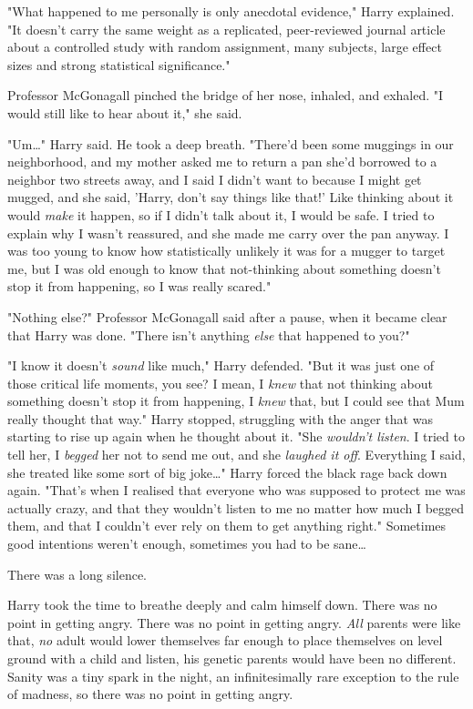 "What happened to me personally is only anecdotal evidence," Harry explained. 
"It doesn't carry the same weight as a replicated, peer-reviewed journal 
article about a controlled study with random assignment, many subjects, large 
effect sizes and strong statistical significance."

Professor McGonagall pinched the bridge of her nose, inhaled, and exhaled. "I 
would still like to hear about it," she said.

"Um{\ldots}" Harry said. He took a deep breath. "There'd been some muggings in 
our neighborhood, and my mother asked me to return a pan she'd borrowed to a 
neighbor two streets away, and I said I didn't want to because I might get 
mugged, and she said, 'Harry, don't say things like that!' Like thinking about 
it would \emph{make} it happen, so if I didn't talk about it, I would be safe. 
I tried to explain why I wasn't reassured, and she made me carry over the pan 
anyway. I was too young to know how statistically unlikely it was for a mugger 
to target me, but I was old enough to know that not-thinking about something 
doesn't stop it from happening, so I was really scared."

"Nothing else?" Professor McGonagall said after a pause, when it became clear 
that Harry was done. "There isn't anything \emph{else} that happened to you?"

"I know it doesn't \emph{sound} like much," Harry defended. "But it was just 
one of those critical life moments, you see? I mean, I \emph{knew} that not 
thinking about something doesn't stop it from happening, I \emph{knew} that, 
but I could see that Mum really thought that way." Harry stopped, struggling 
with the anger that was starting to rise up again when he thought about it. 
"She \emph{wouldn't listen}. I tried to tell her, I \emph{begged} her not to 
send me out, and she \emph{laughed it off}. Everything I said, she treated like 
some sort of big joke{\ldots}" Harry forced the black rage back down again. 
"That's when I realised that everyone who was supposed to protect me was 
actually crazy, and that they wouldn't listen to me no matter how much I begged 
them, and that I couldn't ever rely on them to get anything right." Sometimes 
good intentions weren't enough, sometimes you had to be sane{\ldots}

There was a long silence.

Harry took the time to breathe deeply and calm himself down. There was no point 
in getting angry. There was no point in getting angry. \emph{All} parents were 
like that, \emph{no} adult would lower themselves far enough to place 
themselves on level ground with a child and listen, his genetic parents would 
have been no different. Sanity was a tiny spark in the night, an 
infinitesimally rare exception to the rule of madness, so there was no point in 
getting angry.

